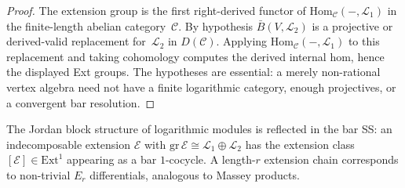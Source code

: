 \begin{proof}
The extension group is the first right-derived functor of
$\mathrm{Hom}_{\mathcal C}(-,\mathcal L_1)$ in the finite-length
abelian category~$\mathcal C$. By hypothesis
$\bar{B}(V,\mathcal L_2)$ is a projective or derived-valid
replacement for~$\mathcal L_2$ in $D(\mathcal C)$. Applying
$\mathrm{Hom}_{\mathcal C}(-,\mathcal L_1)$ to this replacement and taking
cohomology computes the derived internal hom, hence the displayed
Ext groups. The hypotheses are essential: a merely non-rational vertex
algebra need not have a finite logarithmic category, enough
projectives, or a convergent bar resolution.
\end{proof}

\begin{remark}
\label{rem:jordan-bar-spectral}
The Jordan block structure of logarithmic modules is reflected in the bar SS: an indecomposable extension $\mathcal{E}$ with $\mathrm{gr}\,\mathcal{E} \cong \mathcal{L}_1 \oplus \mathcal{L}_2$ has the extension class $[\mathcal{E}] \in \mathrm{Ext}^1$ appearing as a bar $1$-cocycle. A length-$r$ extension chain corresponds to non-trivial $E_r$ differentials, analogous to Massey products.
\end{remark}

